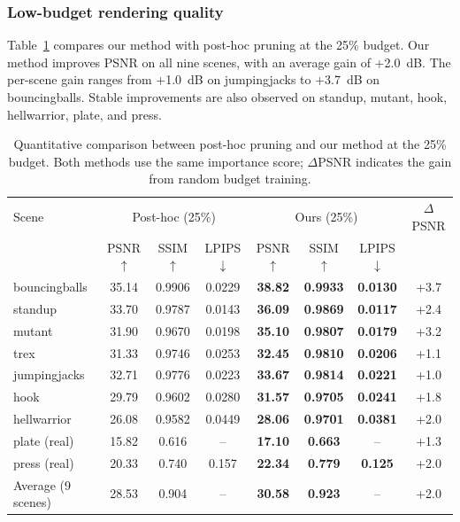 \documentclass[pdflatex,sn-mathphys]{sn-jnl}
\begin{document}
\subsubsection{Low-budget rendering quality}

Table~\ref{tab:main_25} compares our method with post-hoc pruning at the 25\% budget. Our method improves PSNR on all nine scenes, with an average gain of +2.0~dB. The per-scene gain ranges from +1.0~dB on jumpingjacks to +3.7~dB on bouncingballs. Stable improvements are also observed on standup, mutant, hook, hellwarrior, plate, and press.

\begin{table}[!htbp]
\caption{Quantitative comparison between post-hoc pruning and our method at the 25\% budget. Both methods use the same importance score; $\Delta$PSNR indicates the gain from random budget training.}
\label{tab:main_25}
\centering
\small
\setlength{\tabcolsep}{3.2pt}
\begin{tabular}{lccc|ccc|c}
\toprule
Scene & \multicolumn{3}{c}{Post-hoc (25\%)} & \multicolumn{3}{c}{Ours (25\%)} & $\Delta$PSNR \\
& PSNR$\uparrow$ & SSIM$\uparrow$ & LPIPS$\downarrow$ & PSNR$\uparrow$ & SSIM$\uparrow$ & LPIPS$\downarrow$ & \\
\midrule
bouncingballs & 35.14 & 0.9906 & 0.0229 & \textbf{38.82} & \textbf{0.9933} & \textbf{0.0130} & +3.7 \\
standup       & 33.70 & 0.9787 & 0.0143 & \textbf{36.09} & \textbf{0.9869} & \textbf{0.0117} & +2.4 \\
mutant        & 31.90 & 0.9670 & 0.0198 & \textbf{35.10} & \textbf{0.9807} & \textbf{0.0179} & +3.2 \\
trex          & 31.33 & 0.9746 & 0.0253 & \textbf{32.45} & \textbf{0.9810} & \textbf{0.0206} & +1.1 \\
jumpingjacks  & 32.71 & 0.9776 & 0.0223 & \textbf{33.67} & \textbf{0.9814} & \textbf{0.0221} & +1.0 \\
hook          & 29.79 & 0.9602 & 0.0280 & \textbf{31.57} & \textbf{0.9705} & \textbf{0.0241} & +1.8 \\
hellwarrior   & 26.08 & 0.9582 & 0.0449 & \textbf{28.06} & \textbf{0.9701} & \textbf{0.0381} & +2.0 \\
\midrule
plate (real)  & 15.82 & 0.616  & --     & \textbf{17.10} & \textbf{0.663}  & --       & +1.3 \\
press (real)  & 20.33 & 0.740  & 0.157  & \textbf{22.34} & \textbf{0.779}  & \textbf{0.125} & +2.0 \\
\midrule
Average (9 scenes) & 28.53 & 0.904  & --     & \textbf{30.58} & \textbf{0.923}  & --       & +2.0 \\
\bottomrule
\end{tabular}
\end{table}
\end{document}
